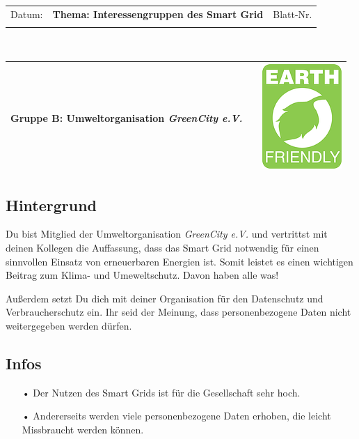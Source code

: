 \documentclass[11pt,a4paper,DIV=10,parskip=half,BCOR=0mm]{scrartcl}
\begin{document}
%
\setlength{\tabcolsep}{3mm} %
\noindent
\begin{tabularx}{\textwidth}{|l|T|l|}
\hline
Datum: & \rule{0pt}{5mm} \textbf{\textsf{Thema: Interessengruppen des Smart Grid}} & Blatt-Nr. \\
&&\\ 
\hline
\end{tabularx}
\rule{0pt}{3mm} \\
\setlength{\tabcolsep}{0mm} %
\begin{tabularx}{\linewidth}{lXr}
{\Large\textsf{\textbf{Gruppe B:} Umweltorganisation \textit{GreenCity e.V.}}} & & \includegraphics[scale=0.25]{images/green}\\
\hline
\end{tabularx}
%
\subsection*{Hintergrund}
Du bist Mitglied der Umweltorganisation \textit{GreenCity e.V.} und vertrittst
mit deinen Kollegen die Auffassung, dass das Smart Grid notwendig für einen sinnvollen Einsatz von erneuerbaren Energien ist. Somit leistet es einen wichtigen Beitrag zum Klima- und Umeweltschutz. Davon haben alle was!

Außerdem setzt Du dich mit deiner Organisation für den Datenschutz und
Verbraucherschutz ein. Ihr seid der Meinung, dass personenbezogene Daten nicht weitergegeben werden dürfen.
\subsection*{Infos}
\begin{enumerate}
	\item[•]Der Nutzen des Smart Grids ist für die Gesellschaft sehr hoch.
	\item[•]Andererseits werden viele personenbezogene Daten erhoben, die leicht Missbraucht werden können. 
\end{enumerate}
\end{document}
